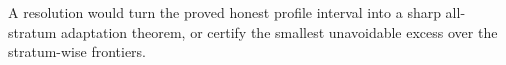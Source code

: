 A resolution would turn the proved honest profile interval into a sharp all-stratum adaptation theorem, or certify the smallest unavoidable excess over the stratum-wise frontiers.